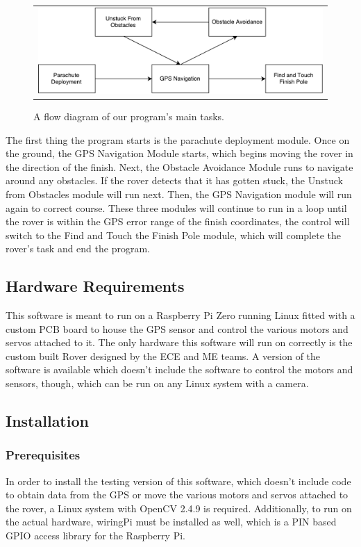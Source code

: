 \documentclass[10pt,letterpaper,onecolumn,draftclsnofoot,journal]{IEEEtran}
\begin{document}
\begin{figure}[h]
  \centering
  \caption{A flow diagram of our program's main tasks.}
  \begin{tabular}{c}
    \includegraphics[page=1, scale=0.5]{flowchart.pdf}
  \end{tabular}
\end{figure}

The first thing the program starts is the parachute deployment module. Once on the ground, the GPS Navigation Module starts, which begins moving the rover in the direction of the finish. Next, the Obstacle Avoidance Module runs to navigate around any obstacles. If the rover detects that it has gotten stuck, the Unstuck from Obstacles module will run next. Then, the GPS Navigation module will run again to correct course. These three modules will continue to run in a loop until the rover is within the GPS error range of the finish coordinates, the control will switch to the Find and Touch the Finish Pole module, which will complete the rover's task and end the program.\vspace{.3cm}

\subsection{\textbf{Hardware Requirements}}
This software is meant to run on a Raspberry Pi Zero running Linux fitted with a custom PCB board to house the GPS sensor and control the various motors and servos attached to it. The only hardware this software will run on correctly is the custom built Rover designed by the ECE and ME teams. A version of the software is available which doesn't include the software to control the motors and sensors, though, which can be run on any Linux system with a camera.\vspace{.3cm}

\subsection{\textbf{Installation}}
\subsubsection{\textbf{Prerequisites}}
In order to install the testing version of this software, which doesn't include code to obtain data from the GPS or move the various motors and servos attached to the rover, a Linux system with OpenCV 2.4.9 is required. Additionally, to run on the actual hardware, wiringPi must be installed as well, which is a PIN based GPIO access library for the Raspberry Pi.\vspace{.3cm}
\end{document}
